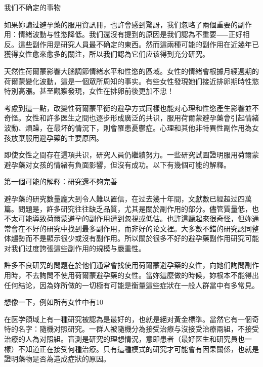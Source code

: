 \documentclass[12pt,UTF8]{ctexbook}
\begin{document}
我们不确定的事物




如果妳讀过避孕藥的服用資訊冊，也許會感到驚訝，我们忽略了兩個重要的副作用：情緒波動与性慾降低。我们還沒有提到的原因是我们認為不重要⸺正好相反。這些副作用是研究人員最不确定的東西。然而這兩種可能的副作用在近幾年已獲得女性愈來愈多的關注，所以我们認為它们应该得到充分研究。

天然性荷爾蒙影響大腦調節情緒水平和性慾的區域。女性的情緒會根據月經週期的荷爾蒙變化波動，這是一個眾所周知的事实。有些女性發現她们接近排卵期時性慾特別高漲。甚至觀察發現，女性在排卵前後更加不忠！

考慮到這一點，改變性荷爾蒙平衡的避孕方式同樣也能对心理和性慾產生影響並不奇怪。女性和許多医生之間也逐步形成廣泛的共识，服用荷爾蒙避孕藥會引起情緒波動、煩躁，在最坏的情況下，則會罹患憂鬱症。心理和其他非特異性副作用為女孩放棄服用避孕藥的主要原因。

即使女性之間存在這項共识，研究人員仍繼續努力。一些研究試圖證明服用荷爾蒙避孕藥对女孩的情緒有負面影響，但沒有成功。以下有幾個可能的解釋。





第一個可能的解釋：研究還不夠完善

避孕藥的研究數量龐大到令人難以置信，在过去幾十年間，文獻數已經超过四萬篇。問題是，許多研究往往缺乏品質，尤其是關於副作用的部分。儘管質量低，也不太可能導致荷爾蒙避孕的副作用遭到忽視或低估。也許這聽起來很奇怪，但妳通常會在不好的研究中找到最多副作用，而非好的论文裡。大多數不錯的研究認同整体趨勢而不是顯示很少或沒有副作用。所以關於很多不好的避孕藥副作用研究可能对我们过度誇張這些副作用的規模与嚴重性。

許多不良研究的問題在於他们通常會找使用荷爾蒙避孕藥的女性，向她们詢問副作用時，不去詢問不使用荷爾蒙避孕藥的女性。當妳這麼做的時候，妳根本不能得出任何結论，因為妳所做的一切極有可能是衡量這些症狀在一般人群當中有多常見。

想像一下，例如所有女性中有10%

在医学領域上有一種研究被認為是最好的，也就是絕对黃金標準。當然它有一個奇特的名字：隨機对照研究。一群人被隨機分為接受治療与沒接受治療兩組，不接受治療的人為对照組。盲測是研究的理想情況，意即患者（最好医生和研究員也一樣）不知道正在接受何種治療。只有這種模式的研究才可能會有因果關係，也就是證明藥物是否為造成症狀的原因。
\end{document}
